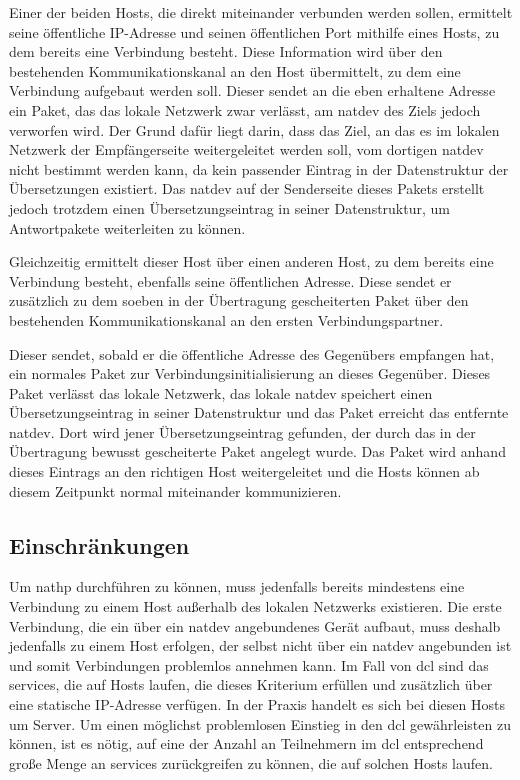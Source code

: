 Einer der beiden Hosts, die direkt miteinander verbunden werden sollen,
ermittelt seine öffentliche IP-Adresse und seinen öffentlichen Port mithilfe
eines Hosts, zu dem bereits eine Verbindung besteht.
Diese Information wird über den bestehenden Kommunikationskanal an den Host
übermittelt, zu dem eine Verbindung aufgebaut werden soll.
Dieser sendet an die eben erhaltene Adresse ein Paket, das das lokale Netzwerk
zwar verlässt, am \gls{natdev} des Ziels jedoch verworfen wird.
Der Grund dafür liegt darin, dass das Ziel, an das es im lokalen Netzwerk der
Empfängerseite weitergeleitet werden soll, vom dortigen \gls{natdev} nicht
bestimmt werden kann, da kein passender Eintrag in der Datenstruktur der
Übersetzungen existiert.
Das \gls{natdev} auf der Senderseite dieses Pakets erstellt jedoch trotzdem
einen Übersetzungseintrag in seiner Datenstruktur, um Antwortpakete weiterleiten
zu können.

Gleichzeitig ermittelt dieser Host über einen anderen Host, zu dem bereits eine
Verbindung besteht, ebenfalls seine öffentlichen Adresse.
Diese sendet er zusätzlich zu dem soeben in der Übertragung gescheiterten Paket
über den bestehenden Kommunikationskanal an den ersten Verbindungspartner.

Dieser sendet, sobald er die öffentliche Adresse des Gegenübers empfangen hat,
ein normales Paket zur Verbindungsinitialisierung an dieses Gegenüber.
Dieses Paket verlässt das lokale Netzwerk, das lokale \gls{natdev} speichert
einen Übersetzungseintrag in seiner Datenstruktur und das Paket erreicht das
entfernte \gls{natdev}.
Dort wird jener Übersetzungseintrag gefunden, der durch das in der Übertragung
bewusst gescheiterte Paket angelegt wurde.
Das Paket wird anhand dieses Eintrags an den richtigen Host weitergeleitet und
die Hosts können ab diesem Zeitpunkt normal miteinander kommunizieren.

\subsection{Einschränkungen}
Um \gls{nathp} durchführen zu können, muss jedenfalls bereits mindestens eine
Verbindung zu einem Host außerhalb des lokalen Netzwerks existieren.
Die erste Verbindung, die ein über ein \gls{natdev} angebundenes Gerät aufbaut,
muss deshalb jedenfalls zu einem Host erfolgen, der selbst nicht über ein
\gls{natdev} angebunden ist und somit Verbindungen problemlos annehmen kann.
Im Fall von \gls{dcl} sind das \glspl{service}, die auf Hosts laufen, die dieses
Kriterium erfüllen und zusätzlich über eine statische IP-Adresse verfügen.
In der Praxis handelt es sich bei diesen Hosts um Server.
Um einen möglichst problemlosen Einstieg in den \gls{dcl} gewährleisten zu
können, ist es nötig, auf eine der Anzahl an Teilnehmern im \gls{dcl}
entsprechend große Menge an \glspl{service} zurückgreifen zu können, die auf
solchen Hosts laufen.
